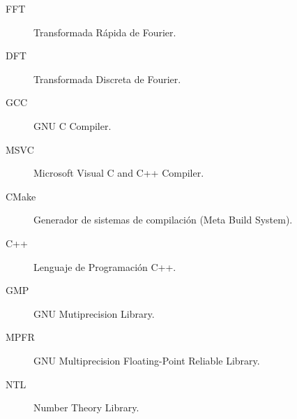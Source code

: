 \begin{description}
	\item[FFT] Transformada Rápida de Fourier.
	
	\item[DFT] Transformada Discreta de Fourier.
	
	\item[GCC] GNU C Compiler.
	
	\item[MSVC] Microsoft Visual C and C++ Compiler.
	
	\item[CMake] Generador de sistemas de compilación (Meta Build System).
	
	\item[C++] Lenguaje de Programación C++.
	
	\item[GMP] GNU Mutiprecision Library.
	
	\item[MPFR] GNU Multiprecision Floating-Point Reliable Library.
	
	\item[NTL] Number Theory Library.
\end{description}
\endinput
